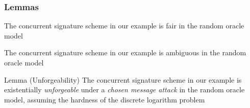 \begin{frame}
	\frametitle{Lemmas}

	\begin{lemma}[Fairness]
		The concurrent signature scheme in our example is fair in the random oracle model
	\end{lemma}

	\begin{lemma}[Ambiguity]
		The concurrent signature scheme in our example is ambiguous in the random oracle model
  \end{lemma}	
  
  \begin{alertblock}{Lemma (Unforgeability)}
    The concurrent signature scheme in our example is existentially \textit{unforgeable} under a \textit{chosen message attack} in the random oracle model, assuming the hardness of the discrete logarithm problem
  \end{alertblock}	
\end{frame}
